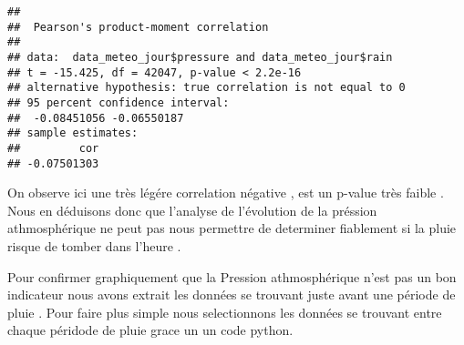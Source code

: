 \documentclass[
]{article}
\begin{document}
\begin{verbatim}
## 
##  Pearson's product-moment correlation
## 
## data:  data_meteo_jour$pressure and data_meteo_jour$rain
## t = -15.425, df = 42047, p-value < 2.2e-16
## alternative hypothesis: true correlation is not equal to 0
## 95 percent confidence interval:
##  -0.08451056 -0.06550187
## sample estimates:
##         cor 
## -0.07501303
\end{verbatim}

On observe ici une très légére correlation négative , est un p-value
très faible . Nous en déduisons donc que l'analyse de l'évolution de la
préssion athmosphérique ne peut pas nous permettre de determiner
fiablement si la pluie risque de tomber dans l'heure .

Pour confirmer graphiquement que la Pression athmosphérique n'est pas un
bon indicateur nous avons extrait les données se trouvant juste avant
une période de pluie . Pour faire plus simple nous selectionnons les
données se trouvant entre chaque péridode de pluie grace un un code
python.
\end{document}
